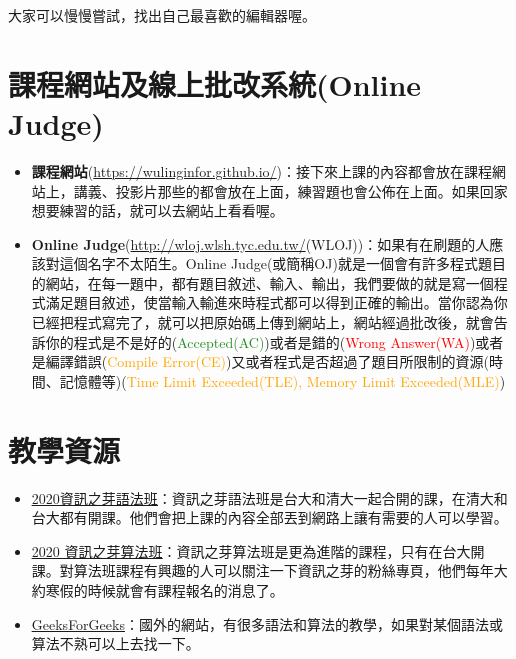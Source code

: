 \documentclass[a4paper, 11pt, oneside]{book}
\newcommand{\wlojURL}{http://wloj.wlsh.tyc.edu.tw/}
\begin{document}
大家可以慢慢嘗試，找出自己最喜歡的編輯器喔。



\section{課程網站及線上批改系統(Online Judge)}
\begin{itemize}
    \item \textbf{課程網站}(\url{https://wulinginfor.github.io/})：接下來上課的內容都會放在課程網站上，講義、投影片那些的都會放在上面，練習題也會公佈在上面。如果回家想要練習的話，就可以去網站上看看喔。
    \item \textbf{Online Judge}(\url{\wlojURL }(WLOJ))：如果有在刷題的人應該對這個名字不太陌生。Online Judge(或簡稱OJ)就是一個會有許多程式題目的網站，在每一題中，都有題目敘述、輸入、輸出，我們要做的就是寫一個程式滿足題目敘述，使當輸入輸進來時程式都可以得到正確的輸出。當你認為你已經把程式寫完了，就可以把原始碼上傳到網站上，網站經過批改後，就會告訴你的程式是不是好的(\textcolor{ForestGreen}{Accepted(AC)})或者是錯的(\textcolor{red}{Wrong Answer(WA)})或者是編譯錯誤(\textcolor{orange}{Compile Error(CE)})又或者程式是否超過了題目所限制的資源(時間、記憶體等)(\textcolor{orange}{Time Limit Exceeded(TLE), Memory Limit Exceeded(MLE)})
\end{itemize}

\section{教學資源}
\begin{itemize}
    \item \href{https://tw-csie-sprout.github.io/c2020/#!index.md}{\underline{2020資訊之芽語法班}}：資訊之芽語法班是台大和清大一起合開的課，在清大和台大都有開課。他們會把上課的內容全部丟到網路上讓有需要的人可以學習。
    \item \href{https://www.csie.ntu.edu.tw/~sprout/algo2020/}{\underline{2020 資訊之芽算法班}}：資訊之芽算法班是更為進階的課程，只有在台大開課。對算法班課程有興趣的人可以關注一下資訊之芽的粉絲專頁，他們每年大約寒假的時候就會有課程報名的消息了。
    \item \href{www.geeksforgeeks.org}{\underline{GeeksForGeeks}}：國外的網站，有很多語法和算法的教學，如果對某個語法或算法不熟可以上去找一下。
\end{itemize}
\end{document}
